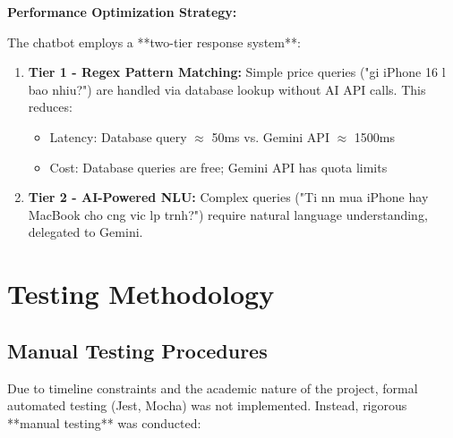 \documentclass[12pt, a4paper]{report}
\begin{document}
\textbf{Performance Optimization Strategy:}

The chatbot employs a **two-tier response system**:
\begin{enumerate}
    \item \textbf{Tier 1 - Regex Pattern Matching:} Simple price queries ("gi iPhone 16 l bao nhiu?") are handled via database lookup without AI API calls. This reduces:
    \begin{itemize}
        \item Latency: Database query $\approx$ 50ms vs. Gemini API $\approx$ 1500ms
        \item Cost: Database queries are free; Gemini API has quota limits
    \end{itemize}
    
    \item \textbf{Tier 2 - AI-Powered NLU:} Complex queries ("Ti nn mua iPhone hay MacBook cho cng vic lp trnh?") require natural language understanding, delegated to Gemini.
\end{enumerate}

\section{Testing Methodology}

\subsection{Manual Testing Procedures}

Due to timeline constraints and the academic nature of the project, formal automated testing (Jest, Mocha) was not implemented. Instead, rigorous **manual testing** was conducted:
\end{document}
